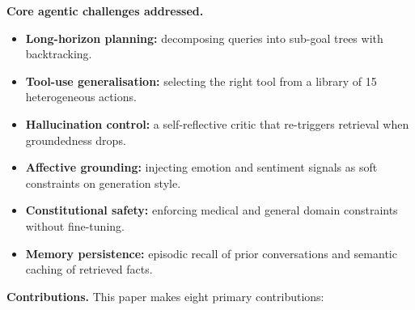 \documentclass[10pt,conference]{IEEEtran}
\theoremstyle{ieeethm}
\theoremstyle{ieeedef}
\theoremstyle{ieeeremark}
\begin{document}
\textbf{Core agentic challenges addressed.}
\begin{itemize}[leftmargin=*,nosep]
  \item \textbf{Long-horizon planning:} decomposing queries into sub-goal trees with backtracking.
  \item \textbf{Tool-use generalisation:} selecting the right tool from a library of 15 heterogeneous actions.
  \item \textbf{Hallucination control:} a self-reflective critic that re-triggers retrieval when groundedness drops.
  \item \textbf{Affective grounding:} injecting emotion and sentiment signals as soft constraints on generation style.
  \item \textbf{Constitutional safety:} enforcing medical and general domain constraints without fine-tuning.
  \item \textbf{Memory persistence:} episodic recall of prior conversations and semantic caching of retrieved facts.
\end{itemize}

\textbf{Contributions.} This paper makes eight primary contributions:
\end{document}
